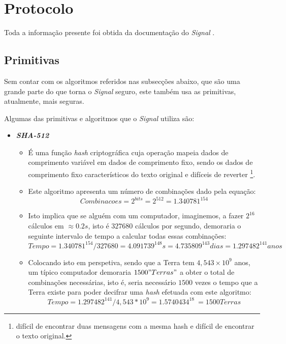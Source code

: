 \section{Protocolo}
Toda a informação presente foi obtida da documentação do \textit{Signal} \cite{signal}.

\subsection{Primitivas}
Sem contar com os algoritmos referidos nas subsecções abaixo, que são uma grande parte do que torna o \textit{Signal} seguro, este também usa as primitivas, atualmente, mais seguras.

Algumas das primitivas e algoritmos que o \textit{Signal} utiliza são:
\begin{itemize}
    \item \textbf{\textit{SHA-512}}
    \begin{itemize}
        \item É uma função \textit{hash} criptográfica cuja operação mapeia dados de comprimento variável em dados de comprimento fixo, sendo os dados de comprimento fixo característicos do texto original e difíceis de reverter \footnote{difícil de encontrar duas mensagens com a mesma hash e difícil de  encontrar o texto original.}.
        \item Este algoritmo apresenta um número de combinações dado pela equação:
        \begin{equation}
            Combinacoes=2^{bits}=2^{512}=1.340781^{154}
        \end{equation}

        \item Isto implica que se alguém com um computador, imaginemos, a fazer $2^{16}$ cálculos em $\approx 0.2s$, isto é $327680$ cálculos por segundo, demoraria o seguinte intervalo de tempo a calcular todas essas combinações:
        \begin{equation}
            Tempo = 1.340781^{154} / 327680 = 4.091739^{148}s = 4.735809^{143} dias = 1.297482^{141} anos
        \end{equation}

        \item Colocando isto em perspetiva, sendo que a Terra tem $4,543\times10^9$ anos, um típico computador demoraria $1500 "Terras"$ a obter o total de combinações necessárias, isto é, seria necessário $1500$ vezes o tempo que a Terra existe para poder decifrar uma \textit{hash} efetuada com este algoritmo:
        \begin{equation}
        Tempo = 1.297482^{141} /4,543*10^{9} = 1.5740434^{18} ~= 1500 Terras
        \end{equation}
    \end{itemize}


\end{itemize}
